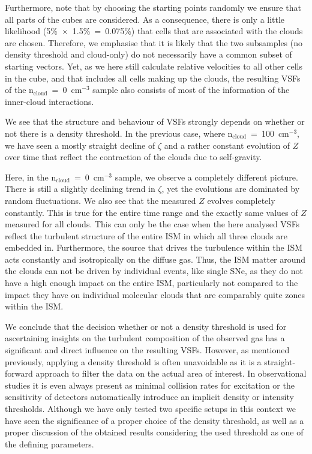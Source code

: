 Furthermore, note that by choosing the starting points randomly we ensure that all parts of the cubes are considered. 
As a consequence, there is only a little likelihood (5\%~$\times$~1.5\%~=~0.075\%) that cells that are associated with the clouds are chosen.
Therefore, we emphasise that it is likely that the two subsamples (no density threshold and cloud-only) do not necessarily have a common subset of starting vectors.
Yet, as we here still calculate relative velocities to all other cells in the cube, and that includes all cells making up the clouds, the resulting VSFs of the n$_\mathrm{cloud}$~=~0~cm$^{-3}$ sample also consists of most of the information of the inner-cloud interactions.

We see that the structure and behaviour of VSFs strongly depends on whether or not there is a density threshold. 
In the previous case, where n$_\mathrm{cloud}$~=~100~cm$^{-3}$, we have seen a mostly straight decline of $\zeta$ and a rather constant evolution of $Z$ over time that reflect the contraction of the clouds due to self-gravity.

Here, in the n$_\mathrm{cloud}$~=~0~cm$^{-3}$ sample, we observe a completely different picture.
There is still a slightly declining trend in $\zeta$, yet the evolutions are dominated by random fluctuations.
We also see that the measured $Z$ evolves completely constantly.
This is true for the entire time range and the exactly same values of $Z$ measured for all clouds.
This can only be the case when the here analysed VSFs reflect the turbulent structure of the entire ISM in which all three clouds are embedded in.
Furthermore, the source that drives the turbulence within the ISM acts constantly and isotropically on the diffuse gas.
Thus, the ISM matter around the clouds can not be driven by individual events, like single SNe, as they do not have a high enough impact on the entire ISM, particularly not compared to the impact they have on individual molecular clouds that are comparably quite zones within the ISM.

We conclude that the decision whether or not a density threshold is used for ascertaining insights on the turbulent composition of the observed gas has a significant and direct influence on the resulting VSFs.
However, as mentioned previously, applying a density threshold is often unavoidable as it is a straight-forward approach to filter the data on the actual area of interest.
In observational studies it is even always present as minimal collision rates for excitation or the sensitivity of detectors automatically introduce an implicit density or intensity thresholds. 
Although we have only tested two specific setups in this context we have seen the significance of a proper choice of the density threshold, as well as a proper discussion of the obtained results considering the used threshold as one of the defining parameters.



